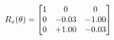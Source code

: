 \documentclass[preview]{standalone}
\begin{document}
\begin{align*}
\special{dvisvgm:raw <g id='unique000'>}R_{x}(\theta) = \begin{bmatrix}1 & 0 & 0 \\0 & -0.03 & -1.00 \\0 & +1.00 & -0.03\end{bmatrix}\special{dvisvgm:raw </g>}
\end{align*}
\end{document}
